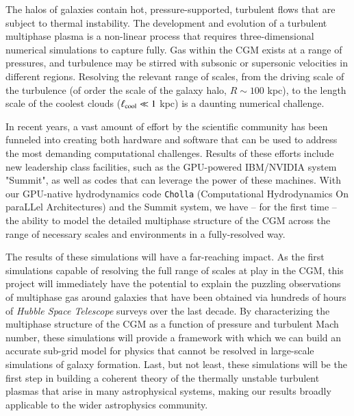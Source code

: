 \documentclass[11pt,letterpaper,english]{article}
\begin{document}
The halos of galaxies contain hot, pressure-supported, turbulent flows that are subject to thermal instability. The development and evolution of a turbulent multiphase plasma is a non-linear process that requires three-dimensional numerical simulations to capture fully. Gas within the CGM exists at a range of pressures, and turbulence may be stirred with subsonic or supersonic velocities in different regions. Resolving the relevant range of scales, from the driving scale of the turbulence (of order the scale of the galaxy halo, $R\sim 100$ kpc), to the length scale of the coolest clouds ($\ell_{\rm cool} \ll 1$ kpc) is a daunting numerical challenge.
\vspace{.15in}

In recent years, a vast amount of effort by the scientific community has been funneled into creating both hardware and software that can be used to address the most demanding computational challenges. Results of these efforts include new leadership class facilities, such as the GPU-powered IBM/NVIDIA system "Summit", as well as codes that can leverage the power of these machines. With our GPU-native hydrodynamics code {\tt Cholla} (Computational Hydrodynamics On paraLLel Architectures) and the Summit system, we have -- for the first time -- the ability to model the detailed multiphase structure of the CGM across the range of necessary scales and environments in a fully-resolved way.
\vspace{.15in}

The results of these simulations will have a far-reaching impact. As the first simulations capable of resolving the full range of scales at play in the CGM, this project will immediately have the potential to explain the puzzling observations of multiphase gas around galaxies that have been obtained via hundreds of hours of {\it Hubble Space Telescope} surveys over the last decade. By characterizing the multiphase structure of the CGM as a function of pressure and turbulent Mach number, these simulations will provide a framework with which we can build an accurate sub-grid model for physics that cannot be resolved in large-scale simulations of galaxy formation. Last, but not least, these simulations will be the first step in building a coherent theory of the thermally unstable turbulent plasmas that arise in many astrophysical systems, making our results broadly applicable to the wider astrophysics community.

\end{document}
